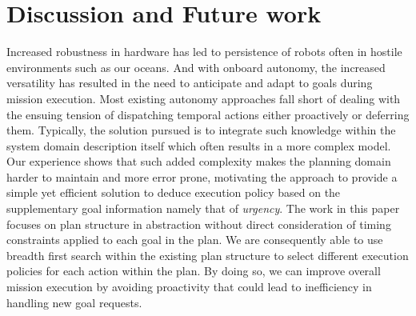 \section{Discussion and Future work}
\label{sec:conclude}

Increased robustness in hardware has led to persistence of robots
often in hostile environments such as our oceans. And with onboard
autonomy, the increased versatility has resulted in the need to anticipate
and adapt to goals during mission execution.  Most existing autonomy
approaches fall short of dealing with the ensuing tension of
dispatching temporal actions either proactively or deferring them.
Typically, the solution pursued is to integrate such knowledge within
the system domain description itself which often results in a more
complex model. Our experience shows that such added complexity makes
the planning domain harder to maintain and more error prone,
motivating the approach to provide a simple yet efficient solution to
deduce execution policy based on the supplementary goal information
namely that of {\em urgency}.  The work in this paper focuses on plan
structure in abstraction without direct consideration of timing
constraints applied to each goal in the plan. We are consequently able
to use breadth first search within the existing plan structure to
select different execution policies for each action within the
plan. By doing so, we can improve overall mission execution by avoiding
proactivity that could lead to inefficiency in handling new goal
requests.

